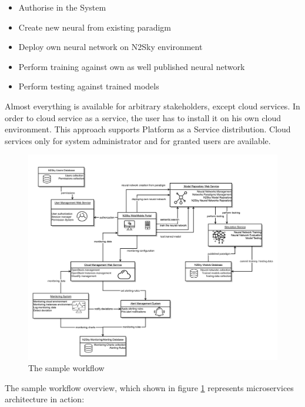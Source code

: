 \begin{itemize}
\item Authorise in the System
\item Create new neural from existing paradigm
\item Deploy own neural network on N2Sky environment 
\item Perform training against own as well published neural network
\item Perform testing against trained models
\end{itemize}

Almost everything is available for arbitrary stakeholders, except cloud services. In order to cloud service as a service, the user has to install it on his own cloud environment. This approach supports Platform as a Service distribution. Cloud services only for system administrator and for granted users are available. 


\begin{figure}[htbp]
\begin{center}
  \includegraphics[width=\linewidth]{components/2/new_arch.png}
  \caption{The sample workflow}
  \label{fig:newarch}
\end{center}
\end{figure}


The sample workflow overview, which shown in figure \ref{fig:newarch} represents microservices architecture in action:


